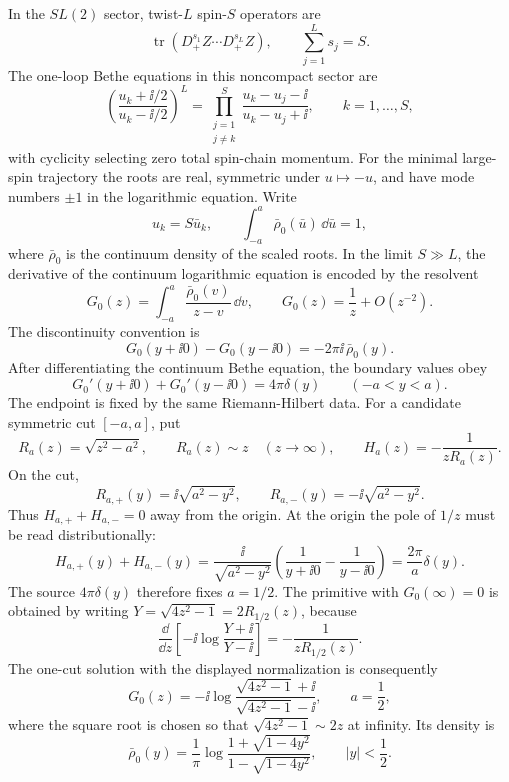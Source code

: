 In the \(SL(2)\) sector, twist-\(L\) spin-\(S\) operators are
\[
  \operatorname{tr}(D_+^{s_1}Z\cdots D_+^{s_L}Z),
  \qquad \sum_{j=1}^Ls_j=S .
\]
The one-loop Bethe equations in this noncompact sector are
\begin{equation}
  \left(\frac{u_k+\ii/2}{u_k-\ii/2}\right)^L
  =
  \prod_{\substack{j=1\\j\neq k}}^S
  \frac{u_k-u_j-\ii}{u_k-u_j+\ii},
  \qquad k=1,\ldots,S,
  \label{eq:planar-n4-sl2-one-loop-bethe}
\end{equation}
with cyclicity selecting zero total spin-chain momentum.  For the minimal
large-spin trajectory the roots are real, symmetric under \(u\mapsto -u\),
and have mode numbers \(\pm1\) in the logarithmic equation.  Write
\[
  u_k=S\bar u_k,
  \qquad
  \int_{-a}^a\bar\rho_0(\bar u)\,\dd\bar u=1,
\]
where \(\bar\rho_0\) is the continuum density of the scaled roots.  In the
limit \(S\gg L\), the derivative of the continuum logarithmic equation is
encoded by the resolvent
\[
  G_0(z)=\int_{-a}^a\frac{\bar\rho_0(v)}{z-v}\,\dd v,
  \qquad
  G_0(z)=\frac1z+O(z^{-2}).
\]
The discontinuity convention is
\[
  G_0(y+\ii0)-G_0(y-\ii0)=-2\pi\ii\,\bar\rho_0(y).
\]
After differentiating the continuum Bethe equation, the boundary values obey
\[
  G_0'(y+\ii0)+G_0'(y-\ii0)=4\pi\delta(y)
  \qquad (-a<y<a).
\]
The endpoint is fixed by the same Riemann-Hilbert data.  For a candidate
symmetric cut \([-a,a]\), put
\[
  R_a(z)=\sqrt{z^2-a^2},\qquad R_a(z)\sim z\quad(z\to\infty),
  \qquad
  H_a(z)=-\frac1{zR_a(z)} .
\]
On the cut,
\[
  R_{a,+}(y)=\ii\sqrt{a^2-y^2},
  \qquad
  R_{a,-}(y)=-\ii\sqrt{a^2-y^2}.
\]
Thus \(H_{a,+}+H_{a,-}=0\) away from the origin.  At the origin the pole of
\(1/z\) must be read distributionally:
\[
  H_{a,+}(y)+H_{a,-}(y)
  =
  \frac{\ii}{\sqrt{a^2-y^2}}
  \left(\frac{1}{y+\ii0}-\frac{1}{y-\ii0}\right)
  =
  \frac{2\pi}{a}\delta(y).
\]
The source \(4\pi\delta(y)\) therefore fixes \(a=1/2\).  The primitive with
\(G_0(\infty)=0\) is obtained by writing
\(Y=\sqrt{4z^2-1}=2R_{1/2}(z)\), because
\[
  \frac{\dd}{\dd z}
  \left[
  -\ii\log\frac{Y+\ii}{Y-\ii}
  \right]
  =
  -\frac{1}{zR_{1/2}(z)} .
\]
The one-cut solution with the displayed normalization is consequently
\begin{equation}
  G_0(z)
  =
  -\ii
  \log\frac{\sqrt{4z^2-1}+\ii}{\sqrt{4z^2-1}-\ii},
  \qquad a=\frac12,
  \label{eq:planar-n4-sl2-cusp-resolvent}
\end{equation}
where the square root is chosen so that \(\sqrt{4z^2-1}\sim2z\) at infinity.
Its density is
\begin{equation}
  \bar\rho_0(y)
  =
  \frac1\pi
  \log
  \frac{1+\sqrt{1-4y^2}}{1-\sqrt{1-4y^2}},
  \qquad |y|<\frac12 .
  \label{eq:planar-n4-sl2-cusp-density}
\end{equation}
